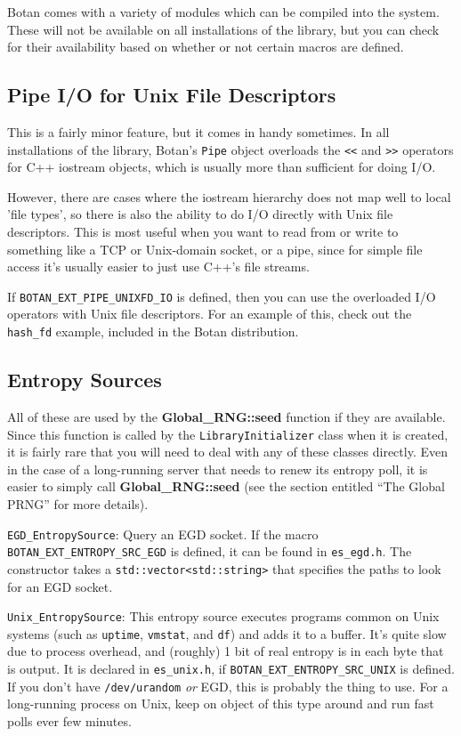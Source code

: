 \documentclass{article}
\newcommand{\filename}[1]{\texttt{#1}}
\newcommand{\macro}[1]{\texttt{#1}}
\newcommand{\function}[1]{\textbf{#1}}
\newcommand{\keyword}[1]{\texttt{#1}}
\newcommand{\type}[1]{\texttt{#1}}
\begin{document}
Botan comes with a variety of modules which can be compiled into the system.
These will not be available on all installations of the library, but you can
check for their availability based on whether or not certain macros are
defined.

\subsection{Pipe I/O for Unix File Descriptors}

This is a fairly minor feature, but it comes in handy sometimes. In all
installations of the library, Botan's \type{Pipe} object overloads the
\keyword{<<} and \keyword{>>} operators for C++ iostream objects, which is
usually more than sufficient for doing I/O.

However, there are cases where the iostream hierarchy does not map well to
local 'file types', so there is also the ability to do I/O directly with Unix
file descriptors. This is most useful when you want to read from or write to
something like a TCP or Unix-domain socket, or a pipe, since for simple file
access it's usually easier to just use C++'s file streams.

If \macro{BOTAN\_EXT\_PIPE\_UNIXFD\_IO} is defined, then you can use the
overloaded I/O operators with Unix file descriptors. For an example of this,
check out the \filename{hash\_fd} example, included in the Botan distribution.

\subsection{Entropy Sources}

All of these are used by the \function{Global\_RNG::seed} function if they are
available. Since this function is called by the \type{LibraryInitializer} class
when it is created, it is fairly rare that you will need to deal with any of
these classes directly. Even in the case of a long-running server that needs to
renew its entropy poll, it is easier to simply call
\function{Global\_RNG::seed} (see the section entitled ``The Global PRNG'' for
more details).

\noindent
\type{EGD\_EntropySource}: Query an EGD socket. If the macro
\macro{BOTAN\_EXT\_ENTROPY\_SRC\_EGD} is defined, it can be found in
\filename{es\_egd.h}. The constructor takes a \type{std::vector<std::string>}
that specifies the paths to look for an EGD socket.

\noindent
\type{Unix\_EntropySource}: This entropy source executes programs common on
Unix systems (such as \filename{uptime}, \filename{vmstat}, and \filename{df})
and adds it to a buffer. It's quite slow due to process overhead, and (roughly)
1 bit of real entropy is in each byte that is output. It is declared in
\filename{es\_unix.h}, if \macro{BOTAN\_EXT\_ENTROPY\_SRC\_UNIX} is
defined. If you don't have \filename{/dev/urandom} \emph{or} EGD, this is
probably the thing to use. For a long-running process on Unix, keep on object
of this type around and run fast polls ever few minutes.
\end{document}
